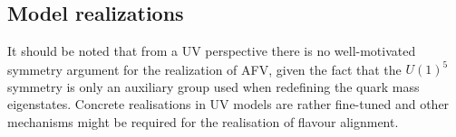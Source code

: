 
\subsection{Model realizations}

It should be noted that from a UV perspective there is no well-motivated symmetry argument for the realization of AFV, given the fact that the $U(1)^5$ symmetry is only an auxiliary group used when redefining the quark mass eigenstates. Concrete realisations in UV models are rather fine-tuned and other mechanisms might be required for the realisation of flavour alignment.

